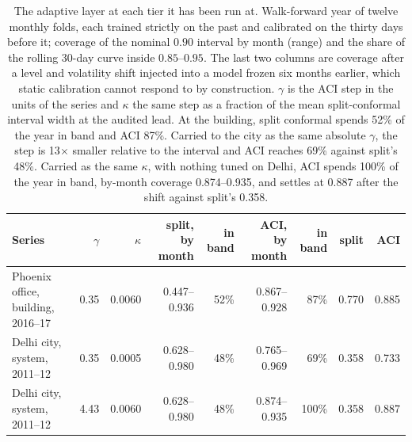 \begin{table}[t]
\centering
\footnotesize
\setlength{\tabcolsep}{3.5pt}
\begin{tabular}{lrrrrrrrr}
\toprule
Series & $\gamma$ & $\kappa$ & split, by month & in band & ACI, by month & in band & split & ACI \\
\midrule
Phoenix office, building, 2016--17 & 0.35 & 0.0060 & 0.447--0.936 & 52\% & 0.867--0.928 & 87\% & 0.770 & 0.885 \\
Delhi city, system, 2011--12 & 0.35 & 0.0005 & 0.628--0.980 & 48\% & 0.765--0.969 & 69\% & 0.358 & 0.733 \\
Delhi city, system, 2011--12 & 4.43 & 0.0060 & 0.628--0.980 & 48\% & 0.874--0.935 & 100\% & 0.358 & 0.887 \\
\bottomrule
\end{tabular}
\caption{The adaptive layer at each tier it has been run at. Walk-forward year of twelve monthly folds, each trained strictly on the past and calibrated on the thirty days before it; coverage of the nominal $0.90$ interval by month (range) and the share of the rolling 30-day curve inside $0.85$--$0.95$. The last two columns are coverage after a level and volatility shift injected into a model frozen six months earlier, which static calibration cannot respond to by construction. $\gamma$ is the ACI step in the units of the series and $\kappa$ the same step as a fraction of the mean split-conformal interval width at the audited lead. At the building, split conformal spends 52\% of the year in band and ACI 87\%. Carried to the city as the same absolute $\gamma$, the step is 13$\times$ smaller relative to the interval and ACI reaches 69\% against split's 48\%. Carried as the same $\kappa$, with nothing tuned on Delhi, ACI spends 100\% of the year in band, by-month coverage 0.874--0.935, and settles at 0.887 after the shift against split's 0.358.}
\label{tab:aci}
\end{table}
